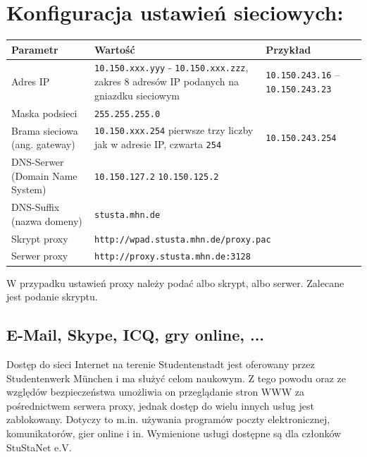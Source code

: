 \documentclass[a4paper,12pt]{scrartcl}
\begin{document}
\section*{Konfiguracja ustawień sieciowych:}

\begin{center}
  \begin{tabularx}{\linewidth}{|lXp{.2\linewidth}|}
    \hline
    Parametr & Wartość & Przykład \\
    \hline \hline
    Adres IP & \nolinkurl{10.150.xxx.yyy} - \nolinkurl{10.150.xxx.zzz}, \newline zakres 8 adresów IP podanych na gniazdku sieciowym & \nolinkurl{10.150.243.16} – \nolinkurl{10.150.243.23} \\
    \hline
    Maska podsieci & \nolinkurl{255.255.255.0} & \\
    \hline
    Brama sieciowa (ang. gateway) & \nolinkurl{10.150.xxx.254} \newline pierwsze trzy liczby jak w adresie IP, czwarta \nolinkurl{254} & \nolinkurl{10.150.243.254} \\
    \hline
    DNS-Serwer (Domain Name System) & \nolinkurl{10.150.127.2} \newline \nolinkurl{10.150.125.2} & \\
    \hline
    DNS-Suffix (nazwa domeny) & \nolinkurl{stusta.mhn.de} & \\
    \hline
    Skrypt proxy & \multicolumn{2}{l|}{\nolinkurl{http://wpad.stusta.mhn.de/proxy.pac}} \\
    \hline
    Serwer proxy & \multicolumn{2}{l|}{\nolinkurl{http://proxy.stusta.mhn.de:3128}} \\
    \hline
  \end{tabularx}
\end{center}

W przypadku ustawień proxy należy podać albo skrypt, albo serwer. Zalecane jest podanie skryptu.

\subsection*{E-Mail, Skype, ICQ, gry online, ...}

Dostęp do sieci Internet na terenie Studentenstadt jest oferowany przez Studentenwerk München i ma służyć celom naukowym. Z tego powodu oraz ze względów bezpieczeństwa umożliwia on przeglądanie stron WWW za pośrednictwem serwera proxy, jednak dostęp do wielu innych usług jest zablokowany. Dotyczy to m.in. używania programów poczty elektronicznej, komunikatorów, gier online i in. Wymienione usługi dostępne są dla członków StuStaNet e.V.
\end{document}
